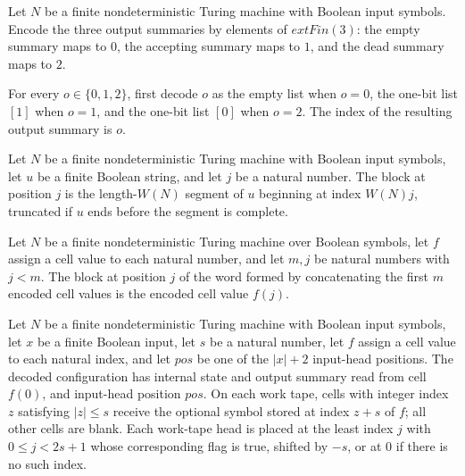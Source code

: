 \begin{definition}
\label{Complexity.Codec.outOf}
\leanok
Let $N$ be a finite nondeterministic Turing machine with Boolean input symbols. Encode
the three output summaries by elements of $	ext{Fin}(3)$: the empty summary maps to $0$,
the accepting summary maps to $1$, and the dead summary maps to $2$.
\end{definition}

\begin{lemma}
\label{Complexity.Codec.sumIdx_outOf}
\leanok
{}
For every $o\in\{0,1,2\}$, first decode $o$ as the empty list when $o=0$, the one-bit
list $[1]$ when $o=1$, and the one-bit list $[0]$ when $o=2$. The index of the resulting
output summary is $o$.
\end{lemma}

\begin{definition}
\label{Complexity.Codec.block}
\leanok
{}
Let $N$ be a finite nondeterministic Turing machine with Boolean input symbols, let $u$
be a finite Boolean string, and let $j$ be a natural number. The block at position $j$
is the length-$W(N)$ segment of $u$ beginning at index $W(N)j$, truncated if $u$ ends
before the segment is complete.
\end{definition}

\begin{lemma}
\label{Complexity.Codec.block_chunksWord}
\leanok
{}
Let $N$ be a finite nondeterministic Turing machine over Boolean symbols, let $f$ assign
a cell value to each natural number, and let $m,j$ be natural numbers with $j<m$. The
block at position $j$ of the word formed by concatenating the first $m$ encoded cell
values is the encoded cell value $f(j)$.
\end{lemma}

\begin{definition}
\label{Complexity.Codec.mkCfg}
\leanok
{}
Let $N$ be a finite nondeterministic Turing machine with Boolean input symbols, let $x$
be a finite Boolean input, let $s$ be a natural number, let $f$ assign a cell value to
each natural index, and let $pos$ be one of the $|x|+2$ input-head positions. The
decoded configuration has internal state and output summary read from cell $f(0)$, and
input-head position $pos$. On each work tape, cells with integer index $z$ satisfying
$|z|\le s$ receive the optional symbol stored at index $z+s$ of $f$; all other cells are
blank. Each work-tape head is placed at the least index $j$ with $0\le j<2s+1$ whose
corresponding flag is true, shifted by $-s$, or at $0$ if there is no such index.
\end{definition}

